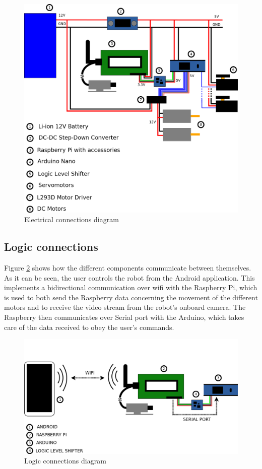 	\begin{figure}[H]
			\centering
			\includegraphics[width=15cm, angle=0]{images/Diagrams/electrical.png}
			\caption{Electrical connections diagram }
			\label{electricDiagram}
	\end{figure}
	\bigskip


\subsection{Logic connections}

Figure \ref{logicDiagram} shows how the different components communicate between themselves. As it can be seen, the user controls the robot from the Android application. This implements a bidirectional communication over wifi with the Raspberry Pi, which is used to both send the Raspberry data concerning the movement of the different motors and to receive the video stream from the robot's onboard camera. The Raspberry then communicates over Serial port with the Arduino, which takes care of the data received to obey the user's commands.\\

	\begin{figure}[H]
			\centering
			\includegraphics[width=15cm, angle=0]{images/Diagrams/logic.png}
			\caption{Logic connections diagram }
			\label{logicDiagram}
	\end{figure}
	\bigskip